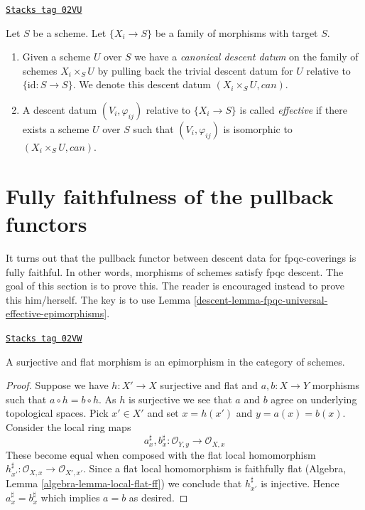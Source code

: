 \begin{definition}
\label{descent-definition-effective-family}
\href{https://stacks.math.columbia.edu/tag/02VU}{\texttt{Stacks tag 02VU}}

Let $S$ be a scheme.
Let $\{X_i \to S\}$ be a family of morphisms
with target $S$.
\begin{enumerate}
\item  Given a scheme $U$ over $S$
we have a {\it canonical descent datum} on the family of
schemes $X_i \times_S U$ by pulling back the trivial
descent datum for $U$ relative to $\{\text{id} : S \to S\}$.
We denote this descent datum $(X_i \times_S U, can)$.
\item A descent datum $(V_i, \varphi_{ij})$
relative to $\{X_i \to S\}$ is called {\it effective}
if there exists a scheme $U$ over $S$ such that
$(V_i, \varphi_{ij})$ is isomorphic to $(X_i \times_S U, can)$.
\end{enumerate}
\end{definition}

\section{Fully faithfulness of the pullback functors}
\label{descent-section-fully-faithful}
It turns out that the pullback functor between descent data
for fpqc-coverings is fully faithful. In other words, morphisms of schemes
satisfy fpqc descent. The goal of this section
is to prove this. The reader is encouraged instead to prove this him/herself.
The key is to use Lemma \ref{descent-lemma-fpqc-universal-effective-epimorphisms}.

\begin{lemma}
\label{descent-lemma-surjective-flat-epi}
\href{https://stacks.math.columbia.edu/tag/02VW}{\texttt{Stacks tag 02VW}}

A surjective and flat morphism is an epimorphism in the
category of schemes.
\end{lemma}

\begin{proof}
Suppose we have $h : X' \to X$ surjective and flat and
$a, b : X \to Y$ morphisms such that $a \circ h = b \circ h$.
As $h$ is surjective we see that $a$ and $b$ agree on underlying
topological spaces. Pick $x' \in X'$ and set $x = h(x')$ and
$y = a(x) = b(x)$. Consider the local ring maps
$$
a^\sharp_x, b^\sharp_x : \mathcal{O}_{Y, y} \to \mathcal{O}_{X, x}
$$
These become equal when composed with
the flat local homomorphism
$h^\sharp_{x'} : \mathcal{O}_{X, x} \to \mathcal{O}_{X', x'}$.
Since a flat local homomorphism is faithfully flat
(Algebra, Lemma \ref{algebra-lemma-local-flat-ff})
we conclude that $h^\sharp_{x'}$ is injective.
Hence $a^\sharp_x = b^\sharp_x$ which implies $a = b$ as desired.
\end{proof}

